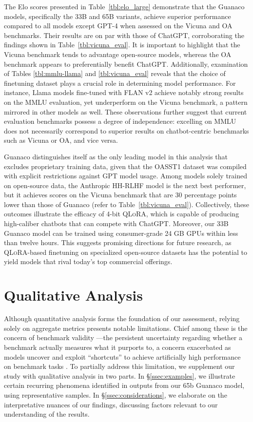 The Elo scores presented in Table~\ref{tbl:elo_large} demonstrate that the {Guanaco} models, specifically the 33B and 65B variants, achieve superior performance compared to all models except GPT-4 when assessed on the Vicuna and OA benchmarks. Their results are on par with those of ChatGPT, corroborating the findings shown in Table~\ref{tbl:vicuna_eval}. It is important to highlight that the Vicuna benchmark tends to advantage open-source models, whereas the OA benchmark appears to preferentially benefit ChatGPT. Additionally, examination of Tables \ref{tbl:mmlu-llama} and \ref{tbl:vicuna_eval} reveals that the choice of finetuning dataset plays a crucial role in determining model performance. For instance, Llama models fine-tuned with FLAN v2 achieve notably strong results on the MMLU evaluation, yet underperform on the Vicuna benchmark, a pattern mirrored in other models as well. These observations further suggest that current evaluation benchmarks possess a degree of independence: excelling on MMLU does not necessarily correspond to superior results on chatbot-centric benchmarks such as Vicuna or OA, and vice versa.

{Guanaco} distinguishes itself as the only leading model in this analysis that excludes proprietary training data, given that the OASST1 dataset was compiled with explicit restrictions against GPT model usage. Among models solely trained on open-source data, the Anthropic HH-RLHF model is the next best performer, but it achieves scores on the Vicuna benchmark that are 30 percentage points lower than those of {Guanaco} (refer to Table~\ref{tbl:vicuna_eval}). Collectively, these outcomes illustrate the efficacy of 4-bit \textsc{QLoRA}, which is capable of producing high-caliber chatbots that can compete with ChatGPT. Moreover, our 33B {Guanaco} model can be trained using consumer-grade 24 GB GPUs within less than twelve hours. This suggests promising directions for future research, as \textsc{QLoRA}-based finetuning on specialized open-source datasets has the potential to yield models that rival today’s top commercial offerings.

\section{Qualitative Analysis}

Although quantitative analysis forms the foundation of our assessment, relying solely on aggregate metrics presents notable limitations. Chief among these is the concern of benchmark validity \citep{liao2021we}—the persistent uncertainty regarding whether a benchmark actually measures what it purports to, a concern exacerbated as models uncover and exploit “shortcuts” to achieve artificially high performance on benchmark tasks \citep{gururangan2018annotation, poliak2018hypothesis}. To partially address this limitation, we supplement our study with qualitative analysis in two parts. In \S\ref{ssec:examples}, we illustrate certain recurring phenomena identified in outputs from our 65b {Guanaco} model, using representative samples. In \S\ref{ssec:considerations}, we elaborate on the interpretative nuances of our findings, discussing factors relevant to our understanding of the results.

